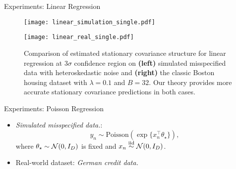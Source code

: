 \documentclass[10pt,xcolor=table]{beamer}
\begin{document}
\begin{frame}{Experiments: Linear Regression}
\begin{figure}
	\centering
	\begin{minipage}[b]{0.4\textwidth}
		\centering
		\texttt{[image: linear\_simulation\_single.pdf]} 
	\end{minipage}
	\hspace{0.0001\textwidth}  %
	\begin{minipage}[b]{0.4\textwidth}
		\centering
		\texttt{[image: linear\_real\_single.pdf]} 
	\end{minipage}
	\caption{Comparison of estimated stationary covariance structure for linear regression at $3\sigma$ confidence region on \textbf{(left)} simulated misspecified data with heteroskedastic noise 
		and \textbf{(right)} the classic Boston housing dataset with $\lambda = 0.1$ and $B = 32$.
		Our theory provides more accurate stationary covariance predictions in both cases.
	}\vspace{-1em}
	\label{Fig: linear regression fixed_lr}
\end{figure}
\end{frame}

\begin{frame}{Experiments: Poisson Regression}
\begin{itemize}
	\item \emph{Simulated misspecified data.}:
\begin{equation*}
	\label{eq: poission regression model}
	y_{n} \sim \text{Poisson}(\exp\{x_{n}^{\top}\theta_{\star}\}),
\end{equation*}
	where $\theta_{\star} \sim \mathcal{N}(0, I_{D})$ is fixed and $x_{n} \overset{\text{iid}}{\sim} \mathcal{N}(0, I_{D})$.
	\item Real-world dataset: \emph{German credit data.}
\end{itemize}
\end{frame}
\end{document}
